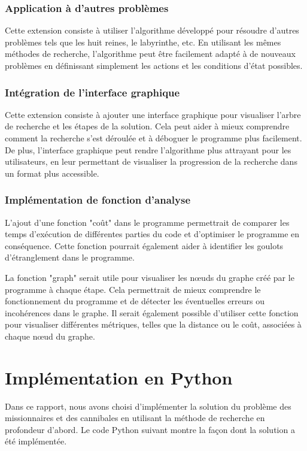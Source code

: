 \documentclass{article}
\begin{document}
\subsubsection{Application à d'autres problèmes}

Cette extension consiste à utiliser l'algorithme développé pour résoudre d'autres problèmes tels que les huit reines, le labyrinthe, etc. En utilisant les mêmes méthodes de recherche, l'algorithme peut être facilement adapté à de nouveaux problèmes en définissant simplement les actions et les conditions d'état possibles.

\subsubsection{Intégration de l'interface graphique}

Cette extension consiste à ajouter une interface graphique pour visualiser l'arbre de recherche et les étapes de la solution. Cela peut aider à mieux comprendre comment la recherche s'est déroulée et à déboguer le programme plus facilement. De plus, l'interface graphique peut rendre l'algorithme plus attrayant pour les utilisateurs, en leur permettant de visualiser la progression de la recherche dans un format plus accessible.

\subsubsection{Implémentation de fonction d'analyse}

L'ajout d'une fonction "coût" dans le programme permettrait de comparer les temps d'exécution de différentes parties du code et d'optimiser le programme en conséquence. Cette fonction pourrait également aider à identifier les goulots d'étranglement dans le programme.

La fonction "graph" serait utile pour visualiser les nœuds du graphe créé par le programme à chaque étape. Cela permettrait de mieux comprendre le fonctionnement du programme et de détecter les éventuelles erreurs ou incohérences dans le graphe. Il serait également possible d'utiliser cette fonction pour visualiser différentes métriques, telles que la distance ou le coût, associées à chaque nœud du graphe.

\section{Implémentation en Python}

Dans ce rapport, nous avons choisi d'implémenter la solution du problème des missionnaires et des cannibales en utilisant la méthode de recherche en profondeur d'abord. Le code Python suivant montre la façon dont la solution a été implémentée.
\end{document}
